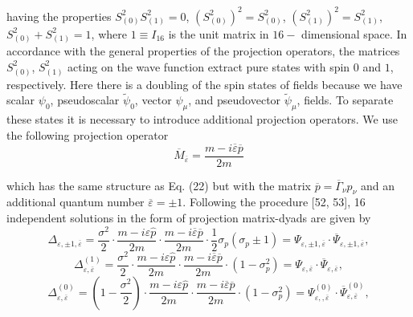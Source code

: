 \documentclass[a4paper,12pt]{article}
\begin{document}
having the properties $S_{(0)}^2S_{(1)}^2=0$, $\left(
S_{(0)}^2\right) ^2=S_{(0)}^2$, $\left( S_{(1)}^2\right)
^2=S_{(1)}^2$, $ S_{(0)}^2+S_{(1)}^2=1 $, where $1\equiv I_{16}$
is the unit matrix in $16-$ dimensional space. In accordance with
the general properties of the projection operators, the matrices
$S_{(0)}^2$, $S_{(1)}^2$ acting on the wave function extract pure
states with spin $0$ and $1$, respectively. Here there is a
doubling of the spin states of fields because we have scalar $
\psi _0$, pseudoscalar $\widetilde{\psi }_0$, vector $\psi _\mu $,
and pseudovector $\widetilde{\psi }_\mu $, fields. To separate
these states it is necessary to introduce additional projection
operators. We use the following projection operator
\begin{equation}
\overline{M}_{\overline{\varepsilon
}}=\frac{m-i\overline{\varepsilon } \overline{p}}{2m}  \label{32}
\end{equation}

which has the same structure as Eq. (22) but with the matrix
$\overline{p}= \overline{\Gamma }_\nu p_\nu $ and an additional
quantum number $\overline{ \varepsilon }=\pm 1$. Following the
procedure [52, 53], 16 independent solutions in the form of
projection matrix-dyads are given by
\[
\Delta _{\varepsilon ,\pm 1,\overline{\varepsilon }}=\frac{\sigma
^2}2\cdot \frac{m-i\varepsilon \widehat{p}}{2m}\cdot
\frac{m-i\overline{\varepsilon } \overline{p}}{2m}\cdot \frac
12\sigma _p\left( \sigma _p\pm 1\right) =\Psi _{\varepsilon ,\pm
1,\overline{\varepsilon }}\cdot \overline{\Psi } _{\varepsilon
,\pm 1,\overline{\varepsilon }} ,
\]
\begin{equation}
\Delta _{\varepsilon ,\overline{\varepsilon }}^{(1)}=\frac{\sigma
^2}2\cdot \frac{m-i\varepsilon \widehat{p}}{2m}\cdot
\frac{m-i\overline{\varepsilon } \overline{p}}{2m}\cdot \left(
1-\sigma _p^2\right) =\Psi _{\varepsilon , \overline{\varepsilon
}}\cdot \overline{\Psi }_{\varepsilon ,\overline{ \varepsilon }} ,
\label{33}
\end{equation}
\[
\Delta _{\varepsilon ,\overline{\varepsilon }}^{(0)}=\left(
1-\frac{\sigma ^2 }2\right) \cdot \frac{m-i\varepsilon
\widehat{p}}{2m}\cdot \frac{m-i \overline{\varepsilon
}\overline{p}}{2m}\cdot \left( 1-\sigma _p^2\right) =\Psi
_{\varepsilon ,,\overline{\varepsilon }}^{(0)}\cdot \overline{\Psi
} _{\varepsilon ,\overline{\varepsilon }}^{(0)} ,
\]
\end{document}
